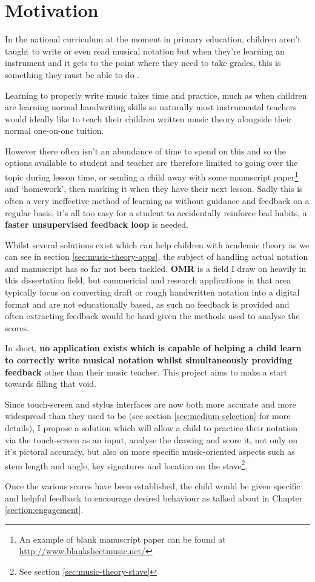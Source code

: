 \section{Motivation}

In the national curriculum at the moment in primary education, children aren't taught to write or even read musical notation \parencite{Attai5} but when they're learning an instrument and it gets to the point where they need to take grades, this is something they must be able to do \parencite{whyMusicTheory}.

Learning to properly write music takes time and practice, much as when children are learning normal handwriting skills so naturally most instrumental teachers would ideally like to teach their children written music theory alongside their normal one-on-one tuition.

However there often isn't an abundance of time to spend on this and so the options available to student and teacher are therefore limited to going over the topic during lesson time, or sending a child away with some manuscript paper\footnote{An example of blank manuscript paper can be found at \url{http://www.blanksheetmusic.net/}} and `homework', then marking it when they have their next lesson. Sadly this is often a very ineffective method of learning as without guidance and feedback on a regular basis, it's all too easy for a student to accidentally reinforce bad habits, a \textbf{faster unsupervised feedback loop} is needed.

Whilst several solutions exist which can help children with academic theory as we can see in section \ref{sec:music-theory-apps}, the subject of handling actual notation and manuscript has so far not been tackled. \textbf{\acrfull{OMR}} is a field I draw on heavily in this dissertation field, but commericial and research applications in that area typically focus on converting draft or rough handwritten notation into a digital format and are not educationally based, as such no feedback is provided and often extracting feedback would be hard given the methods used to analyse the scores.

In short, \textbf{no application exists which is capable of helping a child learn to correctly write musical notation whilst simultaneously providing feedback} other than their music teacher. This project aims to make a start towards filling that void.

Since touch-screen and stylus interfaces are now both more accurate and more widespread than they used to be (see section \ref{sec:medium-selection} for more details), I propose a solution which will allow a child to practice their notation via the touch-screen as an input, analyse the drawing and score it, not only on it's pictoral accuracy, but also on more specific music-oriented aspects such as stem length and angle, key signatures and location on the stave\footnote{See section \ref{sec:music-theory-stave}}.

Once the various scores have been established, the child would be given specific and helpful feedback to encourage desired behaviour as talked about in Chapter \ref{section:engagement}.
